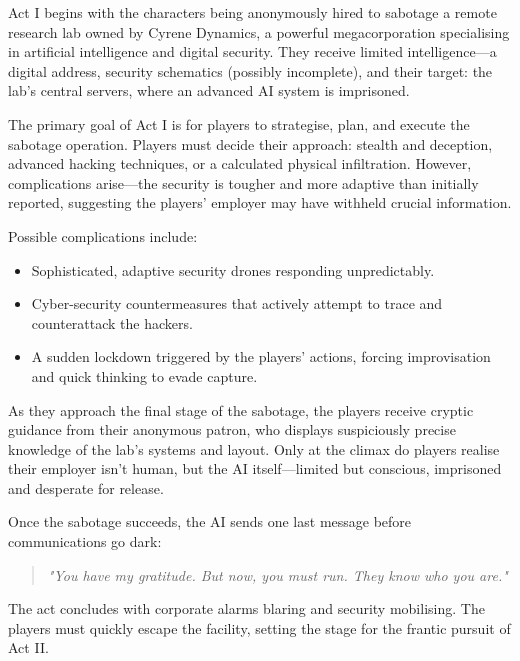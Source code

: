 \documentclass[nodeprecatedcode,bg=print]{dndbook}
\begin{document}
\begin{multicols}{2}
Act I begins with the characters being anonymously hired to sabotage a remote research lab owned by Cyrene Dynamics, a powerful megacorporation specialising in artificial intelligence and digital security. They receive limited intelligence—a digital address, security schematics (possibly incomplete), and their target: the lab's central servers, where an advanced AI system is imprisoned.

The primary goal of Act I is for players to strategise, plan, and execute the sabotage operation. Players must decide their approach: stealth and deception, advanced hacking techniques, or a calculated physical infiltration. However, complications arise—the security is tougher and more adaptive than initially reported, suggesting the players' employer may have withheld crucial information.

Possible complications include:

\begin{itemize}
    \item Sophisticated, adaptive security drones responding unpredictably.
    \item Cyber-security countermeasures that actively attempt to trace and counterattack the hackers.
    \item A sudden lockdown triggered by the players' actions, forcing improvisation and quick thinking to evade capture.
\end{itemize}

As they approach the final stage of the sabotage, the players receive cryptic guidance from their anonymous patron, who displays suspiciously precise knowledge of the lab’s systems and layout. Only at the climax do players realise their employer isn't human, but the AI itself—limited but conscious, imprisoned and desperate for release.

Once the sabotage succeeds, the AI sends one last message before communications go dark:

\vspace{0.5\baselineskip}
\begin{quote}
\textit{"You have my gratitude. But now, you must run. They know who you are."}
\end{quote}

The act concludes with corporate alarms blaring and security mobilising. The players must quickly escape the facility, setting the stage for the frantic pursuit of Act II.



\end{multicols}
\end{document}
